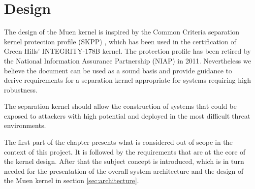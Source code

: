 \chapter{Design}\label{chap:design}
The design of the Muen kernel is inspired by the Common Criteria
separation kernel protection profile (SKPP) \cite{SKPP}, which has
been used in the certification of Green Hills' INTEGRITY-178B kernel. The
protection profile has been retired by the National Information Assurance
Partnership (NIAP) in 2011.  Nevertheless we believe the document can be used
as a sound basis and provide guidance to derive requirements for a separation
kernel appropriate for systems requiring high robustness.

The separation kernel should allow the construction of systems that could be
exposed to attackers with high potential and deployed in the most difficult
threat environments.

The first part of the chapter presents what is considered out of scope in the
context of this project. It is followed by the requirements that are at the core
of the kernel design. After that the subject concept is introduced, which is in
turn needed for the presentation of the overall system architecture and the
design of the Muen kernel in section \ref{sec:architecture}.





